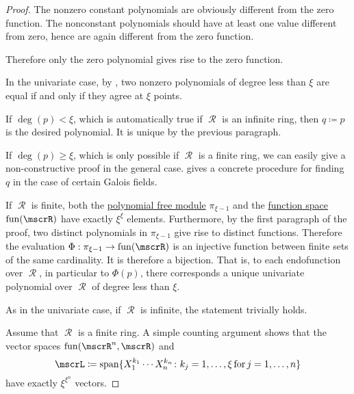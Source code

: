 \begin{proof}
   The nonzero constant polynomials are obviously different from the zero function. The nonconstant polynomials should have at least one value different from zero, hence are again different from the zero function.

  Therefore only the zero polynomial gives rise to the zero function.

   In the univariate case, by , two nonzero polynomials of degree less than \( \xi \) are equal if and only if they agree at \( \xi \) points.

  If \( \deg(p) < \xi \), which is automatically true if \( \mscrR \) is an infinite ring, then \( q \coloneqq p \) is the desired polynomial. It is unique by the previous paragraph.

  If \( \deg(p) \geq \xi \), which is only possible if \( \mscrR \) is a finite ring, we can easily give a non-constructive proof in the general case.  gives a concrete procedure for finding \( q \) in the case of certain Galois fields.

  If \( \mscrR \) is finite, both the \hyperref[def:polynomial_free_module]{polynomial free module} \( \pi_{\xi - 1} \) and the \hyperref[thm:functions_over_ring_form_algebra]{function space} \( \fun(\mscrR) \) have exactly \( \xi^\xi \) elements. Furthermore, by the first paragraph of the proof, two distinct polynomials in \( \pi_{\xi - 1} \) give rise to distinct functions. Therefore the evaluation \( \Phi: \pi_{\xi - 1} \to \fun(\mscrR) \) is an injective function between finite sets of the same cardinality. It is therefore a bijection. That is, to each endofunction over \( \mscrR \), in particular to \( \Phi(p) \), there corresponds a unique univariate polynomial over \( \mscrR \) of degree less than \( \xi \).

   As in the univariate case, if \( \mscrR \) is infinite, the statement trivially holds.

  Assume that \( \mscrR \) is a finite ring. A simple counting argument shows that the vector spaces \( \fun(\mscrR^n, \mscrR) \) and
  \begin{equation*}
    \mscrL \coloneqq \linspan \{ X_1^{k_1} \cdots X_n^{k_n} \colon k_j = 1, \ldots, \xi \T{for} j = 1, \ldots, n \}
  \end{equation*}
  have exactly \( \xi^{\xi^n} \) vectors.


\end{proof}

